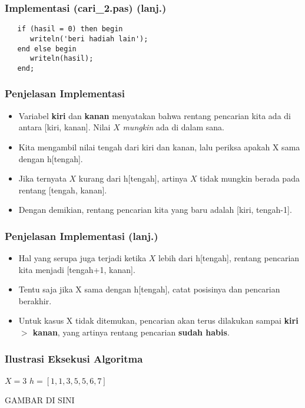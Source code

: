 \documentclass{beamer}
\begin{document}
\begin{frame}[fragile]
\frametitle{Implementasi (cari\_2.pas) (lanj.)}
\begin{lstlisting}
   if (hasil = 0) then begin
      writeln('beri hadiah lain');
   end else begin
      writeln(hasil);
   end;
\end{lstlisting}
\end{frame}

\begin{frame}
\frametitle{Penjelasan Implementasi}
\begin{itemize}
	\item Variabel \textbf{kiri} dan \textbf{kanan} menyatakan bahwa rentang pencarian kita ada di antara [kiri, kanan]. Nilai $X$ \textit{mungkin} ada di dalam sana.
	\item Kita mengambil nilai tengah dari kiri dan kanan, lalu periksa apakah X sama dengan h[tengah].
	\item Jika ternyata $X$ kurang dari h[tengah], artinya $X$ tidak mungkin berada pada rentang [tengah, kanan].
	\item Dengan demikian, rentang pencarian kita yang baru adalah [kiri, tengah-1].
\end{itemize}
\end{frame}

\begin{frame}
\frametitle{Penjelasan Implementasi (lanj.)}
\begin{itemize}
	\item Hal yang serupa juga terjadi ketika $X$ lebih dari h[tengah], rentang pencarian kita menjadi [tengah+1, kanan].
	\item Tentu saja jika X sama dengan h[tengah], catat posisinya dan pencarian berakhir.
	\item Untuk kasus X tidak ditemukan, pencarian akan terus dilakukan sampai \textbf{kiri $>$ kanan}, yang artinya rentang pencarian \textbf{sudah habis}.
\end{itemize}
\end{frame}

\begin{frame}
\frametitle{Ilustrasi Eksekusi Algoritma}
$X=3$ \hfil $h=[1, 1, 3, 5, 5, 6, 7]$

GAMBAR DI SINI
\end{frame}
\end{document}
